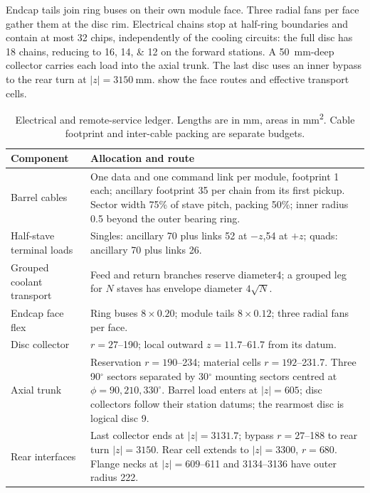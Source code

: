 Endcap tails join ring buses on their own module face. Three radial fans
per face gather them at the disc rim. Electrical chains stop at half-ring
boundaries and contain at most \num{32} chips, independently of the cooling
circuits: the full disc has \num{18} chains, reducing to
\numlist{16;14;12} on the forward stations. A \qty{50}{\milli\metre}-deep
collector carries each load into the axial trunk. The last disc uses an inner
bypass to the rear turn at $|z|=\qty{3150}{\milli\metre}$.
 show the face
routes and effective transport cells.

\begin{table}[!htbp]
\caption{Electrical and remote-service ledger. Lengths are in
\unit{\milli\metre}, areas in \unit{\milli\metre\squared}.
Cable footprint and inter-cable packing are separate budgets.}
\label{tab:pixel-routing}\centering\small
\begin{tabular}{@{}p{.35\linewidth}p{.59\linewidth}@{}}\toprule
Component & Allocation and route\\\midrule
Barrel cables & One data and one command link per module, footprint 1 each;
ancillary footprint 35 per chain from its first pickup. Sector width 75\% of
stave pitch, packing 50\%; inner radius 0.5 beyond the outer bearing ring.\\
Half-stave terminal loads & Singles: ancillary 70 plus links 52 at $-z$,54 at
$+z$; quads: ancillary 70 plus links 26.\\
Grouped coolant transport & Feed and return branches reserve diameter4;
a grouped leg for $N$ staves has envelope diameter $4\sqrt{N}$.\\
Endcap face flex & Ring buses $8\times0.20$; module tails $8\times0.12$;
three radial fans per face.\\
Disc collector & $r=27$--190; local outward $z=11.7$--61.7 from its datum.\\
Axial trunk & Reservation $r=190$--234; material cells $r=192$--231.7.
Three 90$^{\circ}$ sectors separated by 30$^{\circ}$ mounting sectors centred
at $\phi=90,210,330^{\circ}$. Barrel load enters at $|z|=605$;
disc collectors follow their station datums; the rearmost disc is logical disc 9.\\
Rear interfaces & Last collector ends at $|z|=3131.7$; bypass $r=27$--188
to rear turn $|z|=3150$. Rear cell extends to $|z|=3300$, $r=680$.
Flange necks at $|z|=609$--611 and 3134--3136 have outer radius 222.\\\bottomrule
\end{tabular}
\end{table}

